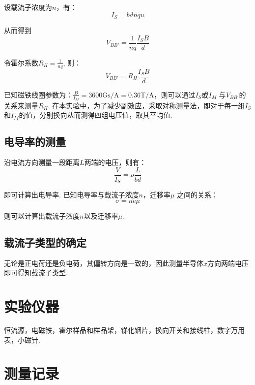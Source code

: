 \documentclass[UTF8]{ctexart}
\begin{document}
设载流子浓度为$n$，有：
\[I_S = bdnqu\]

从而得到
\[V_{BB'} = \frac{1}{nq}\frac{I_SB}{d}\]

令霍尔系数$R_H = \frac{1}{nq}$, 则：
\[V_{BB'} = R_H\frac{I_SB}{d}\]

已知磁铁线圈参数为：$ \frac{B}{I_M} = 3600\mathrm{Gs/A} = 0.36\mathrm{T/A}$，则可以通过$I_S$或$I_M$
与$V_{BB'}$的关系来测量$R_H$. 在本实验中，为了减少副效应，采取对称测量法，即对于每一组$I_S$和$I_M$的值，分别换向从而测得四组电压值，取其平均值.
\subsection{电导率的测量}
沿电流方向测量一段距离$L$两端的电压，则有：
\[\frac{V}{I_S} = \rho \frac{L}{bd}\]

即可计算出电导率. 已知电导率与载流子浓度$n$，迁移率$\mu$ 之间的关系：
\[\sigma = ne\mu\]

则可以计算出载流子浓度$n$以及迁移率$\mu$.
\subsection{载流子类型的确定}
无论是正电荷还是负电荷，其偏转方向是一致的，因此测量半导体$x$方向两端电压即可得知载流子类型.         
\section{实验仪器}
恒流源，电磁铁，霍尔样品和样品架，锑化铟片，换向开关和接线柱，数字万用表，小磁针.
\section{测量记录}
\end{document}
